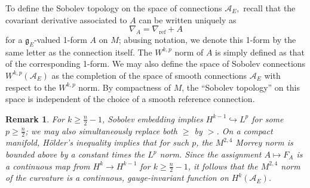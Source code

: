 \documentclass[12pt]{amsart}
\renewcommand{\1}{{\mathbf 1}}
\newcommand{\calA}{\mathcal{A}}
\theoremstyle{others}
\newtheorem{rmk}[thm]{Remark}
\numberwithin{equation}{section}
\newcommand{\inj}{\hookrightarrow}
\begin{document}

To define the Sobolev topology on the space of connections $\calA_E,$ %
recall that the covariant derivative associated to $A$ can be written uniquely as
\[
\nabla_A = \nabla_{\text{ref}} + A
\]
for a \(\mathfrak{g}_E\)-valued 1-form $A$ on \(M\); abusing notation, we denote this 1-form by the same letter as the connection itself. The \(W^{k, p}\) norm of $A$ is simply defined as that of the corresponding 1-form. We may also define the space of Sobolev connections \(W^{k, p}(\calA_E)\) as the completion of the space of smooth connections $\calA_E$ with respect to the \(W^{k, p}\) norm. By compactness of \(M\), the ``Sobolev topology'' on this space is independent of the choice of a smooth reference connection. 

 \begin{rmk}\label{rmk:Hqcontrolsmorrey}
      For \(k \geq \frac{n}{2}-1\), Sobolev embedding implies \(H^{k-1} \inj L^p\) for some \(p \geq \frac{n}{2}\); we may also simultaneously replace both \(\geq\) by \(>\). On a compact manifold, H{\"o}lder's inequality implies that for such \(p\), the $M^{2, 4}$ Morrey norm is bounded above by a constant times the $L^p$ norm.
      Since the assignment \(A \mapsto F_A\) is a continuous map from \(H^k \to H^{k-1}\) for \(k \geq \frac{n}{2}-1\), it follows that the \(M^{2, 4}\) norm of the curvature is a continuous, gauge-invariant function on \(H^k(\mathcal{A}_E)\).
  \end{rmk}
\end{document}
